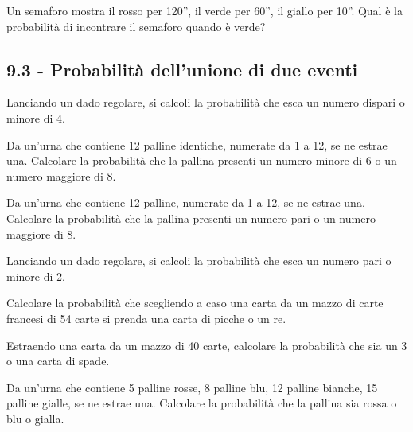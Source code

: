 \begin{esercizio}
 \label{ese:9.26}
Un semaforo mostra il rosso per 120'', il verde per 60'', il giallo per 10''. Qual è la probabilità di incontrare il semaforo quando è verde?
\end{esercizio}

\subsection*{9.3 - Probabilità dell'unione di due eventi}

\begin{esercizio}[\Ast]
 \label{ese:9.27}
 Lanciando un dado regolare, si calcoli la probabilità che esca un numero dispari o minore di 4.
\end{esercizio}

\begin{esercizio}[\Ast]
 \label{ese:9.28}
Da un'urna che contiene 12 palline identiche, numerate da 1 a 12, se ne estrae una. Calcolare la probabilità che la pallina presenti un numero minore di 6 o un numero maggiore di 8.
\end{esercizio}

\begin{esercizio}[\Ast]
 \label{ese:9.29}
Da un'urna che contiene 12 palline, numerate da 1 a 12, se ne estrae una. Calcolare la probabilità che la pallina presenti un numero pari o un numero maggiore di 8.
\end{esercizio}

\begin{esercizio}[\Ast]
 \label{ese:9.30}
Lanciando un dado regolare, si calcoli la probabilità che esca un numero pari o minore di 2.
\end{esercizio}

\begin{esercizio}[\Ast]
 \label{ese:9.31}
Calcolare la probabilità che scegliendo a caso una carta da un mazzo di carte francesi di 54 carte si prenda una carta di picche o un re.
\end{esercizio}

\begin{esercizio}[\Ast]
 \label{ese:9.32}
Estraendo una carta da un mazzo di 40 carte, calcolare la probabilità che sia un 3 o una carta di spade.
\end{esercizio}

\begin{esercizio}[\Ast]
 \label{ese:9.33}
 Da un'urna che contiene 5 palline rosse, 8 palline blu, 12 palline bianche, 15 palline gialle, se ne estrae una. Calcolare la probabilità che la pallina sia rossa o blu o gialla.
\end{esercizio}

